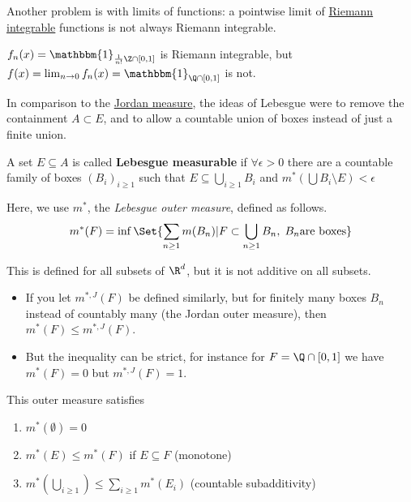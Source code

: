 \documentclass{article}
\newcommand{\1}[1]{\mathbbm{1}_{#1}}
\begin{document}
Another problem is with limits of functions: a pointwise limit of \hyperlink{def:riemannIntegrable}{Riemann integrable} functions is not always Riemann integrable.
\begin{eg}
    $f_n(x) = \1{\frac1{n!}\Z \cap [0, 1]}$ is Riemann integrable, but $f(x) = \lim_{n \to 0} f_n(x) = \1{\Q \cap [0, 1]}$ is not.
\end{eg}

In comparison to the \hyperlink{def:jMeasure}{Jordan measure}, the ideas of Lebesgue were to remove the containment $A \subset E$, and to allow a countable union of boxes instead of just a finite union.
\begin{defi}
    A set $E \subseteq A$ is called \textbf{Lebesgue measurable} if $\forall \epsilon > 0$ there are a countable family of boxes $(B_i)_{i \geq 1}$ such that $E \subseteq \bigcup_{i \geq 1} B_i$ and $m^* (\bigcup B_i \setminus E) < \epsilon$
\end{defi}

Here, we use $m^*$, the \emph{Lebesgue outer measure}, defined as follows.
\begin{equation*}
    m^*(F) = \inf\Set{\sum_{n \geq 1} m(B_n) | F \subset \bigcup_{n \geq 1} B_n, \; B_n \textrm{are boxes}}
\end{equation*}

This is defined for all subsets of $\R^d$, but it is not additive on all subsets.
\begin{remark}
    \leavevmode
    \begin{itemize}
        \item If you let $m^{*, J}(F)$ be defined similarly, but for finitely many boxes $B_n$ instead of countably many (the Jordan outer measure), then $m^*(F) \leq m^{*, J}(F)$.
        \item But the inequality can be strict, for instance for $F = \Q \cap [0, 1]$ we have $m^*(F) = 0$ but $m^{*, J}(F) = 1$.
    \end{itemize}
\end{remark}
This outer measure satisfies
\begin{enumerate}
    \item $m^*(\emptyset) = 0$
    \item $m^*(E) \leq m^*(F)$ if $E \subseteq F$ (monotone)
    \item $m^*(\bigcup_{i \geq 1}) \leq \sum_{i \geq 1} m^* (E_i)$ (countable subadditivity)
\end{enumerate}
\end{document}
